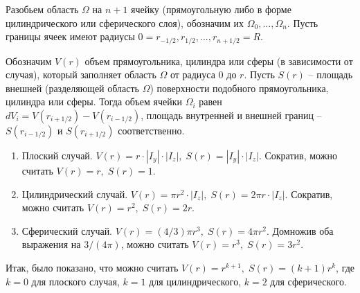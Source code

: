 \documentclass[a4paper,12pt]{article}
\theoremstyle{plain}
\theoremstyle{definition}
\begin{document}
Разобьем область $\Omega$ на $n + 1$ ячейку (прямоугольную либо в форме цилиндрического или сферического слоя), обозначим их $\Omega_0, ..., \Omega_n$. Пусть границы ячеек имеют радиусы $0 = r_{-1/2}, r_{1/2}, ..., r_{n + 1/2} = R$.

Обозначим $V(r)$ объем прямоугольника, цилиндра или сферы (в зависимости от случая), который заполняет область $\Omega$ от радиуса $0$ до $r$. Пусть $S(r)$ -- площадь внешней (разделяющей область $\Omega$) поверхности подобного прямоугольника, цилиндра или сферы. Тогда объем ячейки $\Omega_i$ равен $dV_i = V(r_{i + 1/2}) - V(r_{i - 1/2})$, площадь внутренней и внешней границ -- $S(r_{i - 1/2})$ и $S(r_{i + 1/2})$ соответственно.

\begin{enumerate}[label=\arabic*.]
    \item Плоский случай. $V(r) = r \cdot |I_y| \cdot |I_z|, \; S(r) = |I_y| \cdot |I_z|$. Сократив, можно считать $V(r) = r, \; S(r) = 1$.
    \item Цилиндрический случай. $V(r) = \pi r^2 \cdot |I_z|, \; S(r) = 2 \pi r \cdot |I_z|$. Сократив, можно считать $V(r) = r^2, \; S(r) = 2r$.
    \item Сферический случай. $V(r) = (4/3) \pi r^3, \; S(r) = 4 \pi r^2$. Домножив оба выражения на $3/(4\pi)$, можно считать $V(r) = r^3, \; S(r) = 3 r^2$.
\end{enumerate}

Итак, было показано, что можно считать $V(r) = r^{k + 1}, \; S(r) = (k + 1)r^k$, где $k = 0$ для плоского случая, $k = 1$ для цилиндрического, $k = 2$ для сферического.
\end{document}

